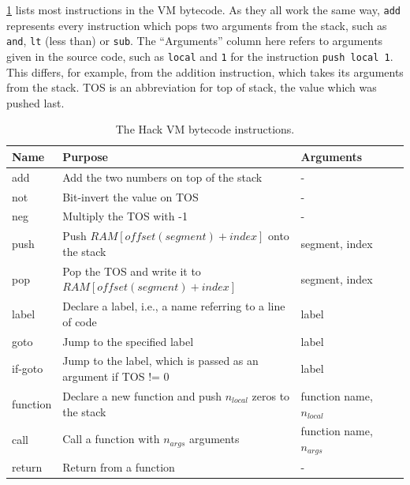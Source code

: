 \cref{table:vm-instructions} lists most instructions in the VM bytecode.
As they all work the same way, \verb+add+ represents every instruction which pops two arguments from the stack, such as \verb+and+, \verb+lt+ (less than) or \verb+sub+.
The ``Arguments'' column here refers to arguments given in the source code, such as \verb+local+ and \verb+1+ for the instruction \verb+push local 1+.
This differs, for example, from the addition instruction, which takes its arguments from the stack.
TOS is an abbreviation for top of stack, the value which was pushed last.

\begin{table}[h]
  \begin{center}
    \centering
    \begin{tabular}{@{}lllll@{}}
      \toprule
      Name     & Purpose                                                        & Arguments \\
      \midrule
      add      & Add the two numbers on top of the stack                        & - \\
      not      & Bit-invert the value on TOS                                    & - \\
      neg      & Multiply the TOS with -1                                       & - \\
      push     & Push \(RAM[offset(segment)+index]\) onto the stack             & segment, index \\
      pop      & Pop the TOS and write it to \(RAM[offset(segment)+index]\)     & segment, index \\
      label    & Declare a label, i.e., a name referring to a line of code       & label \\
      goto     & Jump to the specified label                                    & label \\
      if-goto  & Jump to the label, which is passed as an argument if TOS != 0  & label \\
      function & Declare a new function and push \(n_{local}\) zeros to the stack & function name, \(n_{local}\) \\
      call     & Call a function with \(n_{args}\) arguments                     & function name, \(n_{args}\) \\
      return   & Return from a function                                         &         - \\
      \bottomrule
    \end{tabular}
    \caption{The Hack VM bytecode instructions.}
    \label{table:vm-instructions}
  \end{center}
\end{table}

